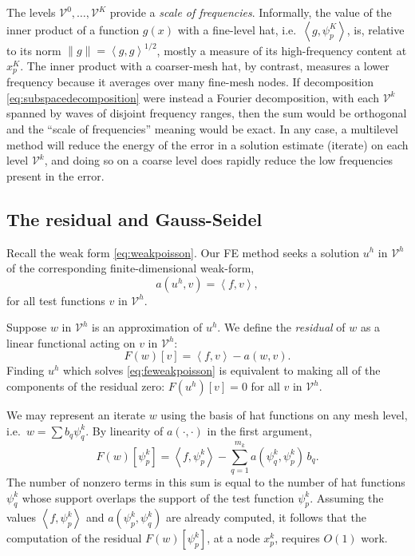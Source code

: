 \documentclass[letterpaper,final,12pt,reqno]{amsart}
\theoremstyle{claim}
\newcommand{\ip}[2]{\left<#1,#2\right>}
\numberwithin{equation}{section}
\numberwithin{figure}{section}
\numberwithin{table}{section}
\begin{document}
The levels $\mathcal{V}^0,\dots,\mathcal{V}^{K}$ provide a \emph{scale of frequencies}.  Informally, the value of the inner product of a function $g(x)$ with a fine-level hat, i.e.~$\ip{g}{\psi_p^K}$, is, relative to its norm $\|g\| = \ip{g}{g}^{1/2}$, mostly a measure of its high-frequency content at $x_p^K$.  The inner product with a coarser-mesh hat, by contrast, measures a lower frequency because it averages over many fine-mesh nodes.  If decomposition \eqref{eq:subspacedecomposition} were instead a Fourier decomposition, with each $\mathcal{V}^k$ spanned by waves of disjoint frequency ranges, then the sum would be orthogonal and the ``scale of frequencies'' meaning would be exact.  In any case, a multilevel method will reduce the energy of the error in a solution estimate (iterate) on each level $\mathcal{V}^k$, and doing so on a coarse level does rapidly reduce the low frequencies present in the error.

\subsection*{The residual and Gauss-Seidel}  Recall the weak form \eqref{eq:weakpoisson}.  Our FE method seeks a solution $u^h$ in $\mathcal{V}^h$ of the corresponding finite-dimensional weak-form,
\begin{equation}
  a(u^h,v) = \ip{f}{v},  \label{eq:feweakpoisson}
\end{equation}
for all test functions $v$ in $\mathcal{V}^h$.

Suppose $w$ in $\mathcal{V}^h$ is an approximation of $u^h$.  We define the \emph{residual} of $w$ as a linear functional acting on $v$ in $\mathcal{V}^h$:
\begin{equation}
  F(w)[v] = \ip{f}{v} - a(w,v).  \label{eq:residual}
\end{equation}
Finding $u^h$ which solves \eqref{eq:feweakpoisson} is equivalent to making all of the components of the residual zero: $F(u^h)[v]=0$ for all $v$ in $\mathcal{V}^h$.

We may represent an iterate $w$ using the basis of hat functions on any mesh level, i.e.~$w = \sum b_q \psi_q^k$.  By linearity of $a(\cdot,\cdot)$ in the first argument,
\begin{equation}
  F(w)[\psi_p^k] = \ip{f}{\psi_p^k} - \sum_{q=1}^{m_k} a(\psi_q^k,\psi_p^k) \,b_q.  \label{eq:residualpoisson}
\end{equation}
The number of nonzero terms in this sum is equal to the number of hat functions $\psi_q^k$ whose support overlaps the support of the test function $\psi_p^k$.  Assuming the values $\ip{f}{\psi_p^k}$ and $a(\psi_p^k,\psi_q^k)$ are already computed, it follows that the computation of the residual $F(w)[\psi_p^k]$, at a node $x_p^k$, requires $O(1)$ work.
\end{document}
